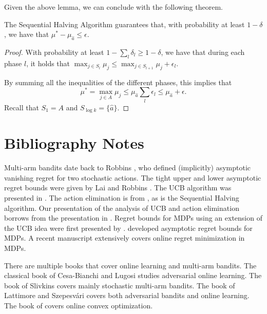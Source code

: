 Given the above lemma, we can conclude with the following theorem.

\begin{theorem}
The Sequential Halving Algorithm guarantees that, with probability at least $1-\delta$, we have that $\mu^*-\mu_{\hat{a}}\leq \epsilon$.
\end{theorem}

\begin{proof}
With probability at least $1- \sum_l \delta_l \geq 1-\delta$, we have that during each phase $l$, it holds that $\max_{j\in
S_{l}}\mu_{j} \leq \max_{j\in S_{l+1}}\mu_{j}+ \epsilon_{l}$.

By summing all the inequalities of the different phases,
this implies that
\[
\mu^*=\max_{j\in
A} \mu_{j} \leq \mu_{\hat{a}} \sum_l \epsilon_{l}\leq \mu_{\hat{a}} +\epsilon.
\]
Recall that $S_1=A$ and $S_{\log k} =\{\hat{a}\}$.
\end{proof}

\section{Bibliography Notes}

Multi-arm bandits date back to Robbins \cite{Robbins52}, who defined (implicitly) asymptotic vanishing regret for two stochastic actions. The tight upper and lower asymptotic regret bounds were given by Lai and Robbins \cite{LaiR85}. The UCB algorithm was presented in \cite{AuerCF02}. The action elimination is from \cite{Even-DarMM06}, as is the Sequential Halving algorithm. Our presentation of the analysis of UCB and action elimination borrows from the presentation in  \cite{Slivkins-book-19}. Regret bounds for MDPs using an extension of the UCB idea were first presented by \citep{auer2008near}. \citep{burnetas1997optimal} developed asymptotic regret bounds for MDPs. A recent manuscript \citep{agarwal2019reinforcement} extensively covers online regret minimization in MDPs.


There are multiple books that cover online learning and multi-arm bandits. The classical book of Cesa{-}Bianchi and Lugosi \cite{Cesa-Bianchi-Lugosi-book} studies adversarial online learning. The book of Slivkins \cite{Slivkins-book-19} covers mainly stochastic multi-arm bandits. The book of Lattimore and Szepesv{\'a}ri \cite{Lattimore-Csaba-book-2020} covers both adversarial bandits and online learning. The book of \citep{hazan2016introduction} covers online convex optimization.
